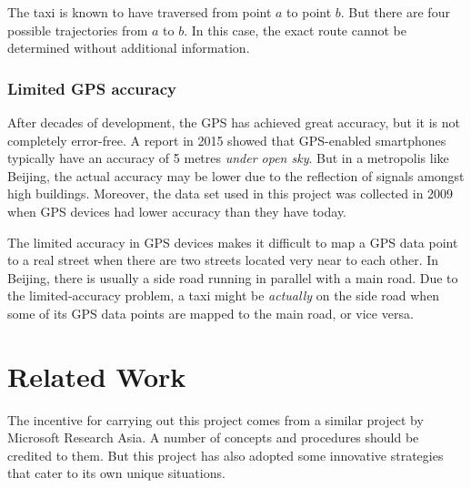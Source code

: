 The taxi is known to have traversed from point $a$ to point $b$. But there are four possible trajectories from $a$ to $b$. In this case, the exact route cannot be determined without additional information.

\subsubsection{Limited GPS accuracy}
After decades of development, the GPS has achieved great accuracy, but it is not completely error-free. A report \cite{FP15} in 2015 showed that GPS-enabled smartphones typically have an accuracy of 5 metres \emph{under open sky}. But in a metropolis like Beijing, the actual accuracy may be lower due to the reflection of signals amongst high buildings. Moreover, the data set used in this project was collected in 2009 when GPS devices had lower accuracy than they have today.

The limited accuracy in GPS devices makes it difficult to map a GPS data point to a real street when there are two streets located very near to each other. In Beijing, there is usually a side road running in parallel with a main road. Due to the limited-accuracy problem, a taxi might be \emph{actually} on the side road when some of its GPS data points are mapped to the main road, or vice versa. 

\section{Related Work}
The incentive for carrying out this project comes from a similar project \cite{TDR10} by Microsoft Research Asia. A number of concepts and procedures should be credited to them. But this project has also adopted some innovative strategies that cater to its own unique situations. 